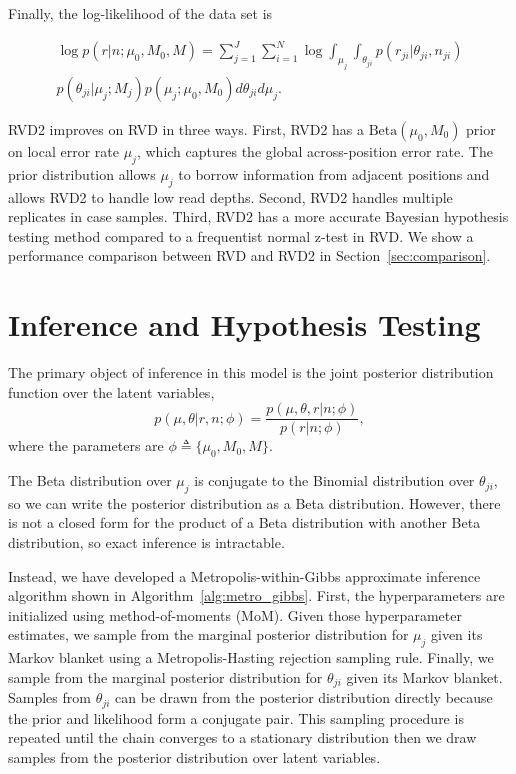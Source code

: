 \documentclass{bioinfo}
\begin{document}
Finally, the log-likelihood of the data set is

\begin{multline}
\log p \left( r | n ; \mu_0, M_0, M \right) = \sum_{j=1}^J \sum_{i=1}^N \log \int_{\mu_j} \int_{\theta_{ji}}  p \left( r_{ji} | \theta_{ji}, n_{ji} \right) \\ p\left( \theta_{ji} | \mu_j; M_j \right) p\left( \mu_j; \mu_0, M_0 \right) d\theta_{ji} d\mu_j.
\end{multline}

\label{Improvement of RVD2}
RVD2 improves on RVD in three ways. First, RVD2 has a $ \text{Beta}(\mu_0, M_0) $ prior on local error rate $ \mu_j $, which captures the global across-position error rate. The prior distribution allows $ \mu_j $ to borrow information from adjacent positions and allows RVD2 to handle low read depths. Second, RVD2 handles multiple replicates in case samples. Third, RVD2 has a more accurate Bayesian hypothesis testing method compared to a frequentist normal z-test in RVD. We show a performance comparison between RVD and RVD2 in Section~\ref{sec:comparison}.

\section{Inference and Hypothesis Testing}

The primary object of inference in this model is the joint posterior distribution function over the latent variables,
\begin{equation}
	p(\mu, \theta | r, n; \phi)  = \frac{ p(\mu, \theta, r | n; \phi) } {p ( r | n; \phi)},
\end{equation}
where the parameters are $\phi \triangleq \{\mu_0, M_0, M\}$.

The Beta distribution over $\mu_j$ is conjugate to the Binomial distribution over $\theta_{ji}$, so we can write the posterior distribution as a Beta distribution. However, there is not a closed form for the product of a Beta distribution with another Beta distribution, so exact inference is intractable.

Instead, we have developed a Metropolis-within-Gibbs  approximate inference algorithm shown in Algorithm~\ref{alg:metro_gibbs}. First, the hyperparameters are initialized using method-of-moments (MoM). Given those hyperparameter estimates, we sample from the marginal posterior distribution for $\mu_j$ given its Markov blanket using a Metropolis-Hasting rejection sampling rule. Finally, we sample from the marginal posterior distribution for $\theta_{ji}$ given its Markov blanket. Samples from $\theta_{ji}$ can be drawn from the posterior distribution directly  because the prior and likelihood form a conjugate pair. This sampling procedure is repeated until the chain converges to a stationary distribution then we draw samples from the posterior distribution over latent variables.
\end{document}
